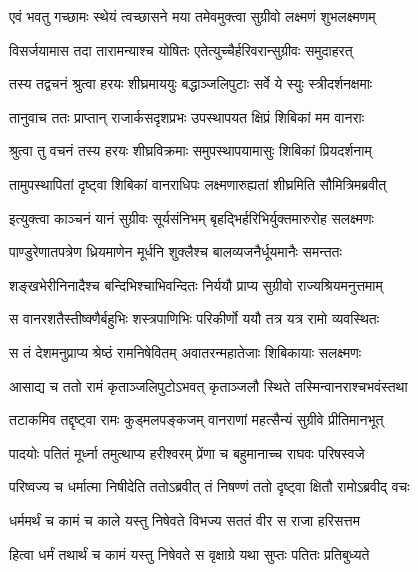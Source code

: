 \twolineshloka
{एवं भवतु गच्छामः स्थेयं त्वच्छासने मया}
{तमेवमुक्त्वा सुग्रीवो लक्ष्मणं शुभलक्ष्मणम्} %

\twolineshloka
{विसर्जयामास तदा तारामन्याश्च योषितः}
{एतेत्युच्चैर्हरिवरान्सुग्रीवः समुदाहरत्} %

\twolineshloka
{तस्य तद्वचनं श्रुत्वा हरयः शीघ्रमाययुः}
{बद्धाञ्जलिपुटाः सर्वे ये स्युः स्त्रीदर्शनक्षमाः} %

\twolineshloka
{तानुवाच ततः प्राप्तान् राजार्कसदृशप्रभः}
{उपस्थापयत क्षिप्रं शिबिकां मम वानराः} %

\twolineshloka
{श्रुत्वा तु वचनं तस्य हरयः शीघ्रविक्रमाः}
{समुपस्थापयामासुः शिबिकां प्रियदर्शनाम्} %

\twolineshloka
{तामुपस्थापितां दृष्ट्वा शिबिकां वानराधिपः}
{लक्ष्मणारुह्यतां शीघ्रमिति सौमित्रिमब्रवीत्} %

\twolineshloka
{इत्युक्त्वा काञ्चनं यानं सुग्रीवः सूर्यसंनिभम्}
{बृहद्भिर्हरिभिर्युक्तमारुरोह सलक्ष्मणः} %

\twolineshloka
{पाण्डुरेणातपत्रेण ध्रियमाणेन मूर्धनि}
{शुक्लैश्च बालव्यजनैर्धूयमानैः समन्ततः} %

\twolineshloka
{शङ्खभेरीनिनादैश्च बन्दिभिश्चाभिवन्दितः}
{निर्ययौ प्राप्य सुग्रीवो राज्यश्रियमनुत्तमाम्} %

\twolineshloka
{स वानरशतैस्तीष्क्णैर्बहुभिः शस्त्रपाणिभिः}
{परिकीर्णो ययौ तत्र यत्र रामो व्यवस्थितः} %

\twolineshloka
{स तं देशमनुप्राप्य श्रेष्ठं रामनिषेवितम्}
{अवातरन्महातेजाः शिबिकायाः सलक्ष्मणः} %

\twolineshloka
{आसाद्य च ततो रामं कृताञ्जलिपुटोऽभवत्}
{कृताञ्जलौ स्थिते तस्मिन्वानराश्चभवंस्तथा} %

\twolineshloka
{तटाकमिव तद्दृष्ट्वा रामः कुड्मलपङ्कजम्}
{वानराणां महत्सैन्यं सुग्रीवे प्रीतिमानभूत्} %

\twolineshloka
{पादयोः पतितं मूर्ध्ना तमुत्थाप्य हरीश्वरम्}
{प्रेंणा च बहुमानाच्च राघवः परिषस्वजे} %

\twolineshloka
{परिष्वज्य च धर्मात्मा निषीदेति ततोऽब्रवीत्}
{तं निषण्णं ततो दृष्ट्वा क्षितौ रामोऽब्रवीद् वचः} %

\twolineshloka
{धर्ममर्थं च कामं च काले यस्तु निषेवते}
{विभज्य सततं वीर स राजा हरिसत्तम} %

\twolineshloka
{हित्वा धर्मं तथार्थं च कामं यस्तु निषेवते}
{स वृक्षाग्रे यथा सुप्तः पतितः प्रतिबुध्यते} %


